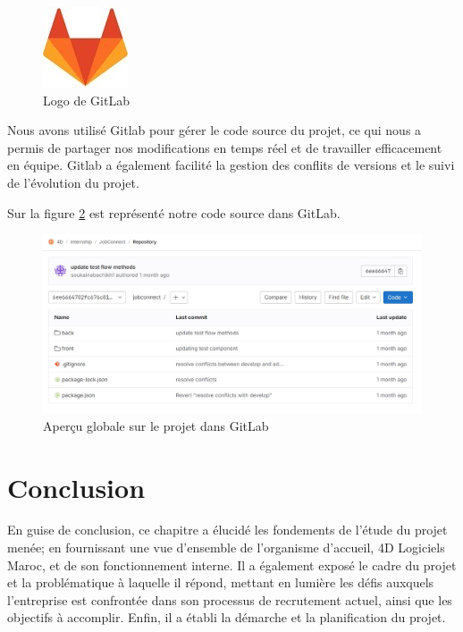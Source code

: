 \begin{figure}[h]
    \centering
    \includegraphics[scale=0.3]{Images/gitlab.jpg} %
    \caption{Logo de GitLab\cite{gitlab}}
    \label{fig:gitlab}
\end{figure}


Nous avons utilisé Gitlab pour gérer le code source du projet, ce qui nous a permis de partager nos modifications en temps réel et de travailler efficacement en équipe. Gitlab a également facilité la gestion des conflits de versions et le suivi de l'évolution du projet.

Sur la figure \ref{fig:lab} est représenté notre code source dans GitLab.
    \begin{figure}[h]
        \centering
        \includegraphics[scale=0.7]{gitlab/whole2.jpg} %
        \caption{Aperçu globale sur le projet dans GitLab}
        \label{fig:lab}
        \end{figure}
\section{Conclusion}
En guise de conclusion, ce chapitre a élucidé les fondements de l’étude du projet
menée; en fournissant une vue d’ensemble de l’organisme d’accueil, 4D Logiciels Maroc,
et de son fonctionnement interne. Il a également exposé le cadre du projet et la problématique à laquelle
il répond, mettant en lumière les défis auxquels l’entreprise est confrontée dans son
processus de recrutement actuel, ainsi que les objectifs à accomplir. Enfin, il a établi la
démarche et la planification du projet.


